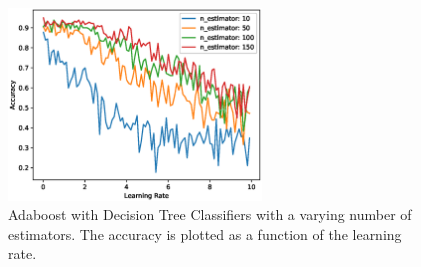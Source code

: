 \documentclass[11pt]{article}
\begin{document}
\begin{figure}[h]
	\centering
	\includegraphics[width=0.6\textwidth]{images/ex2_5_lr_estimators.eps}
	\caption{Adaboost with Decision Tree Classifiers with a varying number of estimators. The accuracy is plotted as a function of the learning rate.}
	\label{fig:lr}
\end{figure}
\end{document}
